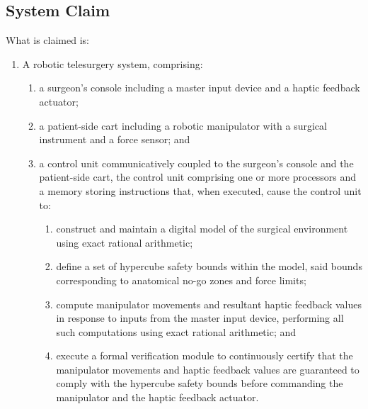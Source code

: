 \documentclass{article}
\begin{document}
\subsection{System Claim}
\noindent What is claimed is:
\begin{enumerate}
    \item A robotic telesurgery system, comprising:
    \begin{enumerate}
        \item[(a)] a surgeon's console including a master input device and a haptic feedback actuator;
        \item[(b)] a patient-side cart including a robotic manipulator with a surgical instrument and a force sensor; and
        \item[(c)] a control unit communicatively coupled to the surgeon's console and the patient-side cart, the control unit comprising one or more processors and a memory storing instructions that, when executed, cause the control unit to:
        \begin{enumerate}
            \item[(i)] construct and maintain a digital model of the surgical environment using exact rational arithmetic;
            \item[(ii)] define a set of hypercube safety bounds within the model, said bounds corresponding to anatomical no-go zones and force limits;
            \item[(iii)] compute manipulator movements and resultant haptic feedback values in response to inputs from the master input device, performing all such computations using exact rational arithmetic; and
            \item[(iv)] execute a formal verification module to continuously certify that the manipulator movements and haptic feedback values are guaranteed to comply with the hypercube safety bounds before commanding the manipulator and the haptic feedback actuator.
        \end{enumerate}
    \end{enumerate}
\end{enumerate}
\end{document}
